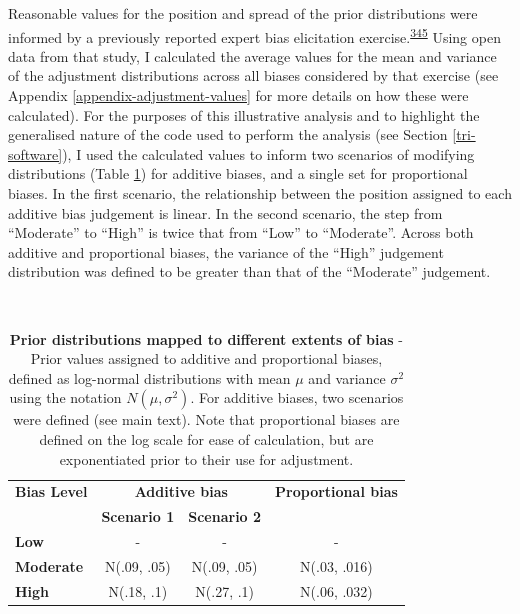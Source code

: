 \documentclass[a4paper, twoside]{templates/ociamthesis}
\begin{document}
Reasonable values for the position and spread of the prior distributions were informed by a previously reported expert bias elicitation exercise.\textsuperscript{\protect\hyperlink{ref-turner2009}{345}} Using open data from that study, I calculated the average values for the mean and variance of the adjustment distributions across all biases considered by that exercise (see Appendix \ref{appendix-adjustment-values} for more details on how these were calculated). For the purposes of this illustrative analysis and to highlight the generalised nature of the code used to perform the analysis (see Section \ref{tri-software}), I used the calculated values to inform two scenarios of modifying distributions (Table \ref{tab:priorsAdd-table}) for additive biases, and a single set for proportional biases. In the first scenario, the relationship between the position assigned to each additive bias judgement is linear. In the second scenario, the step from ``Moderate'' to ``High'' is twice that from ``Low'' to ``Moderate''. Across both additive and proportional biases, the variance of the ``High'' judgement distribution was defined to be greater than that of the ``Moderate'' judgement.

~





\begin{table}[H]

\caption[Prior distributions mapped to different extents of bias.]{\label{tab:priorsAdd-table}\textbf{Prior distributions mapped to different extents of bias} - Prior values assigned to additive and proportional biases, defined as log-normal distributions with mean \(\mu\) and variance \(\sigma^2\) using the notation \(N(\mu,\sigma^{2})\). For additive biases, two scenarios were defined (see main text). Note that proportional biases are defined on the log scale for ease of calculation, but are exponentiated prior to their use for adjustment.}
\centering
\begin{tabular}[t]{>{}lccc}
\toprule
\multicolumn{1}{c}{\textbf{Bias Level}} & \multicolumn{2}{c}{\textbf{Additive bias}} & \multicolumn{1}{c}{\textbf{Proportional bias}} \\
\textbf{} & \textbf{Scenario 1} & \textbf{Scenario 2} & \textbf{}\\
\midrule
\textbf{Low} & - & - & -\\
\midrule
\textbf{Moderate} & N(.09, .05) & N(.09, .05) & N(.03, .016)\\
\midrule
\textbf{High} & N(.18, .1) & N(.27, .1) & N(.06, .032)\\
\bottomrule
\end{tabular}
\end{table}
\end{document}

